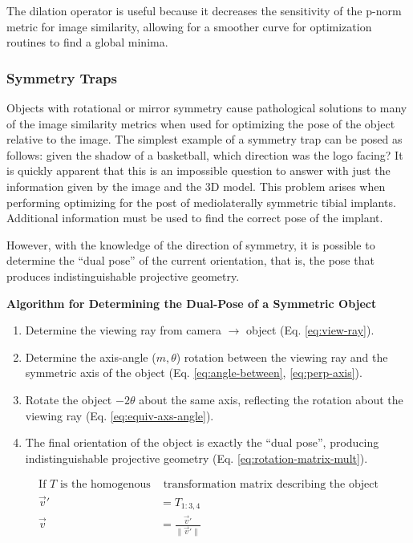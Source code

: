 The dilation operator is useful because it decreases the sensitivity of the p-norm metric for image similarity, allowing for a smoother curve for optimization routines to find a global minima.

\subsubsection{Symmetry Traps}
Objects with rotational or mirror symmetry cause pathological solutions to many of the image similarity metrics when used for optimizing the pose of the object relative to the image. The simplest example of a symmetry trap can be posed as follows: given the shadow of a basketball, which direction was the logo facing? It is quickly apparent that this is an impossible question to answer with just the information given by the image and the 3D model. This problem arises when performing optimizing for the post of mediolaterally symmetric tibial implants. Additional information must be used to find the correct pose of the implant.

However, with the knowledge of the direction of symmetry, it is possible to determine the ``dual pose'' of the current orientation, that is, the pose that produces indistinguishable projective geometry.

\begin{mdframed}
    \begin{center}
        {\bf Algorithm for Determining the Dual-Pose of a Symmetric Object}
    \end{center}
\begin{enumerate}
    \item Determine the viewing ray from camera $\rightarrow$ object (Eq. \ref{eq:view-ray}).
    \item Determine the axis-angle ($m,\theta$) rotation between the viewing ray and the symmetric axis of the object (Eq. \ref{eq:angle-between}, \ref{eq:perp-axis}).
    \item Rotate the object $-2\theta$ about the same axis, reflecting the rotation about the viewing ray (Eq. \ref{eq:equiv-axs-angle}).
    \item The final orientation of the object is exactly the ``dual pose'', producing indistinguishable projective geometry (Eq. \ref{eq:rotation-matrix-mult}).
\end{enumerate}
\end{mdframed}

\begin{equation}
    \begin{aligned}
        \text{If $T$ is the homogenous}& \text{ transformation matrix describing the object} \\
        \vec{v}' &= T_{1:3,4} \\
        \vec{v} & = \frac{\vec{v}'}{\|\vec{v}'\|}
    \end{aligned}
    \label{eq:view-ray}
\end{equation}


